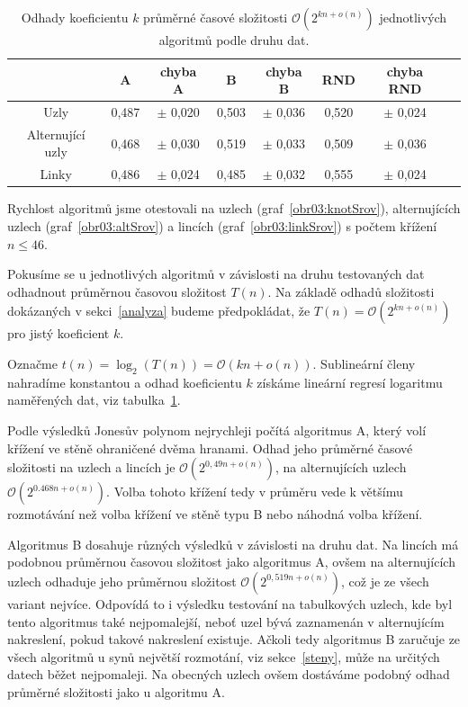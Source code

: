 \begin{table}[p]
\centering
  \begin{tabular}{*{8}{c}}
    \toprule
       & A & chyba A & B & chyba B &  RND & chyba RND \\ 
    \midrule
    Uzly  & 0,487 & $\pm$ 0,020  &   0,503 & $\pm$ 0,036   &  0,520 & $\pm$ 0,024\\
    Alternující uzly & 0,468  & $\pm$ 0,030 &  0,519 & $\pm$  0,033 & 0,509 & $\pm$ 0,036\\
    Linky  & 0,486 &  $\pm$ 0,024 &   0,485 & $\pm$  0,032  &   0,555 & $\pm$ 0,024\\
    \bottomrule
  \end{tabular}
    \caption{Odhady koeficientu $k$ průměrné časové složitosti $\mathcal{O}\left(2^{kn + o(n)}\right)$ jednotlivých algoritmů podle druhu dat.} \label{datatab}

\end{table} 

Rychlost algoritmů jsme otestovali na uzlech (graf~\ref{obr03:knotSrov}), alternujících uzlech (graf~\ref{obr03:altSrov}) a lincích (graf~\ref{obr03:linkSrov}) s počtem křížení $n \leq 46$. 

Pokusíme se u jednotlivých algoritmů v závislosti na druhu testovaných dat odhadnout průměrnou časovou složitost $T(n)$. Na základě odhadů složitosti dokázaných v sekci~\ref{analyza} budeme předpokládat, že $T(n) = \mathcal{O} \left(2^{kn + o(n)}\right)$ pro jistý koeficient $k$.

Označme $t(n) = \log_2(T(n)) = \mathcal{O} \left(kn + o(n)\right) $. Sublineární členy nahradíme konstantou a odhad koeficientu $k$ získáme lineární regresí logaritmu naměřených dat, viz tabulka~\ref{datatab}.

Podle výsledků Jonesův polynom nejrychleji počítá algoritmus A, který volí křížení ve stěně ohraničené dvěma hranami. Odhad jeho průměrné časové složitosti na uzlech a lincích je $\mathcal{O}\left(2^{0,49n+ o(n)}\right)$, na alternujících uzlech $\mathcal{O}\left(2^{0.468 n+ o(n)}\right)$. Volba tohoto křížení tedy v průměru vede k většímu rozmotávání než volba křížení ve stěně typu B nebo náhodná volba křížení. 

Algoritmus B dosahuje různých výsledků v závislosti na druhu dat. Na lincích má podobnou průměrnou časovou složitost jako algoritmus A, ovšem na alternujících uzlech odhaduje jeho průměrnou složitost $\mathcal{O}\left(2^{0,519 n+ o(n)}\right)$, což je ze všech variant nejvíce. Odpovídá to i výsledku testování na tabulkových uzlech, kde byl tento algoritmus také nejpomalejší, neboť uzel bývá zaznamenán v alternujícím nakreslení, pokud takové nakreslení existuje. Ačkoli tedy algoritmus B zaručuje ze všech algoritmů u synů největší rozmotání, viz sekce~\ref{steny}, může na určitých datech běžet nejpomaleji. Na obecných uzlech ovšem dostáváme podobný odhad průměrné složitosti jako u algoritmu A.

